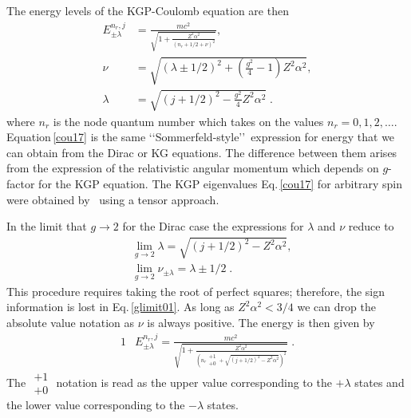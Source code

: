 The energy levels of the KGP-Coulomb equation are then
\begin{subequations}
\begin{alignat}{1}
\label{cou17} E_{\pm\lambda}^{n_{r},j}&=\frac{mc^{2}}{\sqrt{1+\displaystyle\frac{Z^{2}\alpha^{2}}{\left(n_{r}+1/2+\nu\right)^{2}}}},\\[0.2cm]
\label{cou17b} \nu&=\sqrt{(\lambda\pm1/2)^{2}+\left(\frac{g^{2}}{4}-1\right)Z^{2}\alpha^{2}},\\[0.2cm]
\label{cou17c} \lambda&=\sqrt{\displaystyle(j+1/2)^{2}-\frac{\displaystyle g^{2}}{4}Z^{2}\alpha^{2}}\;.
\end{alignat}
\end{subequations}
where $n_{r}$ is the node quantum number which takes on the values $n_{r}=0,1,2,\ldots$. Equation\,\eqref{cou17} is the same \lq\lq Sommerfeld-style\rq\rq\ expression for energy that we can obtain from the Dirac or KG equations. The difference between them arises from the expression of the relativistic angular momentum which depends on $g$-factor for the KGP equation. The KGP eigenvalues Eq.\,\eqref{cou17} for arbitrary spin were obtained by~\cite{Niederle:2004bx} using a tensor approach.

In the limit that $g\rightarrow2$ for the Dirac case the expressions for $\lambda$ and $\nu$ reduce to
\begin{subequations}
\begin{alignat}{1}
\label{glimit01} &\lim_{g\rightarrow2}\lambda=\sqrt{\displaystyle(j+1/2)^{2}-Z^{2}\alpha^{2}},\\
&\lim_{g\rightarrow2}\nu_{\pm\lambda}=\lambda\pm1/2\;.
\end{alignat}
\end{subequations}
This procedure requires taking the root of perfect squares; therefore, the sign information is lost in Eq.\,\eqref{glimit01}. As long as $Z^{2}\alpha^{2}<3/4$ we can drop the absolute value notation as $\nu$ is always positive. The energy is then given by
\begin{alignat}{1}
\label{glimit02} &E_{\pm\lambda}^{n_{r},j}=\frac{mc^{2}}{\sqrt{1+\displaystyle\frac{Z^{2}\alpha^{2}}{\left(n_{r}\begin{smallmatrix} +1 \\ +0 \end{smallmatrix}+\sqrt{\displaystyle(j+1/2)^{2}-Z^{2}\alpha^{2}}\right)^{2}}}}\;.
\end{alignat}
The $\begin{smallmatrix} +1 \\ +0 \end{smallmatrix}$ notation is read as the upper value corresponding to the $+\lambda$ states and the lower value corresponding to the $-\lambda$ states. 

